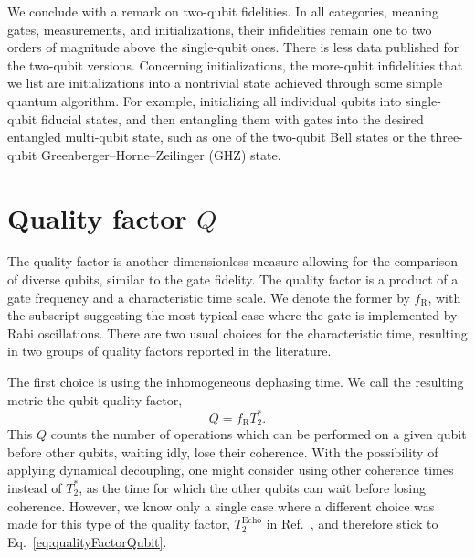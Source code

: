 \documentclass[aps, prx, showpacs, twocolumn, superscriptaddress, notitlepage, longbibliography, floatfix, nofootinbib]{revtex4-2}
\newcommand{\TEcho}{T_2^\mathrm{Echo}}
\newcommand{\recheck}[1]{{#1}}
\begin{document}
We conclude with a remark on two-qubit fidelities. \recheck{In all categories, meaning gates, measurements, and initializations, their infidelities remain one to two orders of magnitude above the single-qubit ones. There is less data published for the two-qubit versions.} \recheck{Concerning initializations, the more-qubit infidelities that we list are initializations into a nontrivial state achieved through some simple quantum algorithm.} For example, initializing all individual qubits into single-qubit fiducial states, and then entangling them with gates into the desired entangled multi-qubit state, such as one of the two-qubit Bell states or the three-qubit Greenberger–Horne–Zeilinger (GHZ) state. 


\section{Quality factor $Q$}

\label{sec:qualityFactor}

The quality factor is another dimensionless measure allowing for the comparison of diverse qubits, similar to the gate fidelity. The quality factor is a product of a gate frequency and a characteristic time scale. We denote the former by $f_\mathrm{R}$, with the subscript suggesting the most typical case where the gate is implemented by Rabi oscillations. There are two usual choices for the characteristic time, resulting in two groups of quality factors reported in the literature. 

The first choice is using the inhomogeneous dephasing time. We call the resulting metric the qubit quality-factor,
\begin{equation}
Q = f_\mathrm{R} T_2^*.
\label{eq:qualityFactorQubit}
\end{equation}
This $Q$ counts the number of operations which can be performed on a given qubit before other qubits, waiting idly, lose their coherence. With the possibility of applying dynamical decoupling, one might consider using other coherence times instead of $T_2^*$, as the time for which the other qubits can wait before losing coherence. However, we know only a single case where a different choice was made for this type of the quality factor, $ \TEcho$ in Ref.~\cite{dial_charge_2013}, and therefore stick to Eq.~\eqref{eq:qualityFactorQubit}. 
\end{document}
